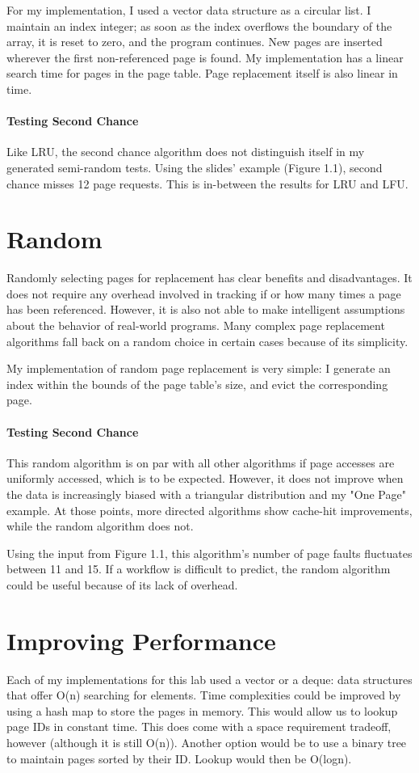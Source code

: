 \documentclass[paper=a4, fontsize=11pt]{scrartcl} %
\numberwithin{equation}{section} %
\numberwithin{figure}{section} %
\numberwithin{table}{section} %
\begin{document}
For my implementation, I used a vector data structure as a circular list. I maintain an index integer; as soon as the index overflows the boundary of the array, it is reset to zero, and the program continues. New pages are inserted wherever the first non-referenced page is found. My implementation has a linear search time for pages in the page table. Page replacement itself is also linear in time.

\paragraph{Testing Second Chance}
Like LRU, the second chance algorithm does not distinguish itself in my generated semi-random tests. Using the slides' example (Figure 1.1), second chance misses 12 page requests. This is in-between the results for LRU and LFU.

\section{Random}
Randomly selecting pages for replacement has clear benefits and disadvantages. It does not require any overhead involved in tracking if or how many times a page has been referenced. However, it is also not able to make intelligent assumptions about the behavior of real-world programs. Many complex page replacement algorithms fall back on a random choice in certain cases because of its simplicity.

My implementation of random page replacement is very simple: I generate an index within the bounds of the page table's size, and evict the corresponding page.

\paragraph{Testing Second Chance}
This random algorithm is on par with all other algorithms if page accesses are uniformly accessed, which is to be expected. However, it does not improve when the data is increasingly biased with a triangular distribution and my "One Page" example. At those points, more directed algorithms show cache-hit improvements, while the random algorithm does not.

Using the input from Figure 1.1, this algorithm's number of page faults fluctuates between 11 and 15. If a workflow is difficult to predict, the random algorithm could be useful because of its lack of overhead.

\section{Improving Performance}
Each of my implementations for this lab used a vector or a deque: data structures that offer O(n) searching for elements. Time complexities could be improved by using a hash map to store the pages in memory. This would allow us to lookup page IDs in constant time. This does come with a space requirement tradeoff, however (although it is still O(n)).
Another option would be to use a binary tree to maintain pages sorted by their ID. Lookup would then be O(logn).
\pagebreak
\end{document}
